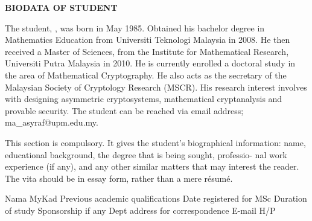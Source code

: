 \begin{center}
\normalsize{\textbf{BIODATA OF STUDENT}}
\end{center}


\thispagestyle{empty}


The student, \textbf{\authorname}, was born in May 1985. Obtained his bachelor degree in Mathematics Education from Universiti Teknologi Malaysia in 2008. He then received a Master of Sciences, from the Institute for Mathematical Research, Universiti Putra Malaysia in 2010. He is currently enrolled a doctoral study in the area of Mathematical Cryptography. He also acts as the secretary of the Malaysian Society of Cryptology Research (MSCR). His research interest involves with designing asymmetric cryptosystems, mathematical cryptanalysis and provable security. The student can be reached via email address; ma\_asyraf@upm.edu.my.










\if %

This section is compulsory. It gives the student’s biographical information:
name, educational background, the degree that is being sought, professio-
nal work experience (if any), and any other similar matters that may
interest the reader. The vita should be in essay form, rather than a mere
résumé.



Nama
MyKad
Previous academic qualifications
Date registered for MSc
Duration of study
Sponsorship if any
Dept address for correspondence
E-mail
H/P



\fi %
